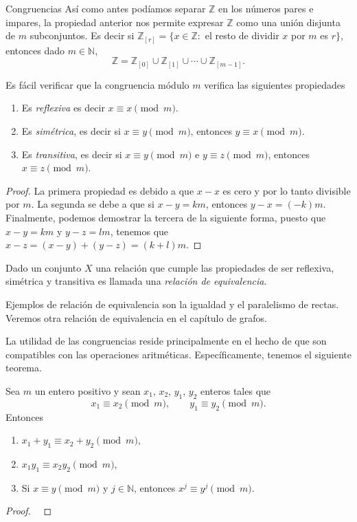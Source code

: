 \begin{section}{Congruencias}
Así como antes podíamos separar $\mathbb Z$ en los números pares e impares, la propiedad anterior nos permite expresar $\mathbb Z$ como una unión disjunta de $m$ subconjuntos. Es decir si $\mathbb  Z_{[r]} =\{x \in \mathbb Z:$ el resto de dividir $x$ por $m$ es $r\}$, entonces dado $m \in \mathbb N$, 
$$
\mathbb Z= \mathbb Z_{[0]}\cup \mathbb Z_{[1]}\cup \cdots\cup \mathbb Z_{[m-1]}.
$$

Es fácil verificar que la {congruencia módulo} $m$ verifica las siguientes propiedades
\begin{enumerate}[label=\textit{\alph*)}]
\item
Es \textit{{reflexiva}} es decir $x\equiv x\pmod{m}$.
\item
Es \textit{{simétrica}}, es decir si $x \equiv y \pmod{m}$, entonces
$y \equiv x \pmod{m}$.
\item
Es \textit{{ transitiva}}, es decir si $x\equiv y \pmod{m}$ e
$y\equiv z \pmod{m}$, entonces $x\equiv z \pmod{m}$.
\end{enumerate}
\begin{proof}
La primera propiedad es debido a que $x-x$ es cero y por lo tanto divisible por $m$. La segunda se debe a que si $x-y=km$, entonces $y-x=(-k)m$. Finalmente, podemos demostrar la tercera de la siguiente forma,  puesto que $x-y=km$ y $y-z=lm$, tenemos que $x-z=(x-y)+(y-z)=(k+l)m$.
\end{proof}

\begin{observacion*}\label{relacion-de-equivalencia}
    Dado un conjunto $X$ una relación que cumple las propiedades de ser reflexiva, simétrica y transitiva es llamada una \textit{relación de equivalencia}.

    Ejemplos de relación de equivalencia son la igualdad y  el paralelismo de rectas. Veremos otra relación de equivalencia en el capítulo de grafos.
\end{observacion*}

La utilidad de las congruencias reside principalmente en el hecho de que son compatibles con las operaciones aritméticas. Específicamente, tenemos el siguiente teorema.

\begin{teorema}\label{t4.1} Sea $m$ un entero positivo y sean $x_1$, $x_2$,
$y_1$, $y_2$ enteros tales que
$$
x_1 \equiv x_2 \pmod{m}, \qquad y_1 \equiv y_2 \pmod{m}.
$$
Entonces
\begin{enumerate}[label=\textit{\alph*)}]
\item\label{it.con.prop_a} $ x_1+ y_1 \equiv x_2+ y_2 \pmod{m}$,
\item\label{it.con.prop_b}  $x_1 y_1 \equiv x_2 y_2 \pmod{m}$,
\item\label{it.con.prop_c}  Si $x \equiv y \pmod{m}$  y $j \in  \mathbb N$, entonces $x^j \equiv y^j \pmod{m}$.
\end{enumerate}
\end{teorema}
\begin{proof}
\


\end{proof}
\end{section}
